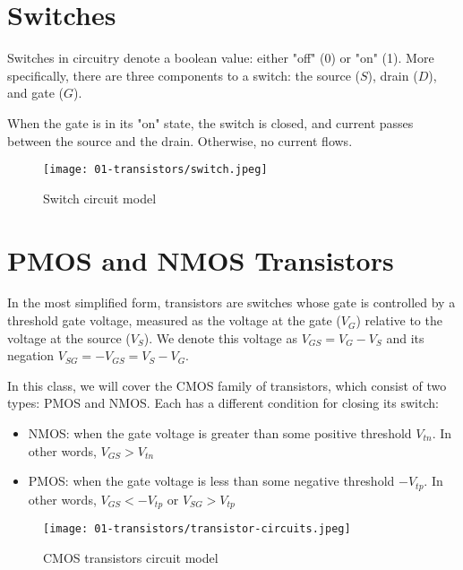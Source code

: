 \documentclass[11pt]{article}
\begin{document}
\maketitle
\tableofcontents
\newpage

\section{Switches}

Switches in circuitry denote a boolean value: either "off" (0) or "on" (1). More specifically, there are three components to a switch: the source ($S$), drain ($D$), and gate ($G$).

When the gate is in its "on" state, the switch is closed, and current passes between the source and the drain. Otherwise, no current flows. 

\begin{figure}[H]
    \centering
        \texttt{[image: 01-transistors/switch.jpeg]}
    \caption{Switch circuit model}
\end{figure}

\section{PMOS and NMOS Transistors}

In the most simplified form, transistors are switches whose gate is controlled by a threshold gate voltage, measured as the voltage at the gate ($V_G$) relative to the voltage at the source ($V_S$). We denote this voltage as $V_{GS}=V_G-V_S$ and its negation $V_{SG}=-V_{GS}=V_S-V_G$.

In this class, we will cover the CMOS family of transistors, which consist of two types: PMOS and NMOS. Each has a different condition for closing its switch:
\begin{itemize}
    \item NMOS: when the gate voltage is greater than some positive threshold $V_{tn}$. In other words, $V_{GS}>V_{tn}$
    \item PMOS: when the gate voltage is less than some negative threshold $-V_{tp}$. In other words, $V_{GS}<-V_{tp}$ or $V_{SG}>V_{tp}$
\end{itemize}

\begin{figure}[H]
    \centering
        \texttt{[image: 01-transistors/transistor-circuits.jpeg]}
    \caption{CMOS transistors circuit model}
\end{figure}
\end{document}
